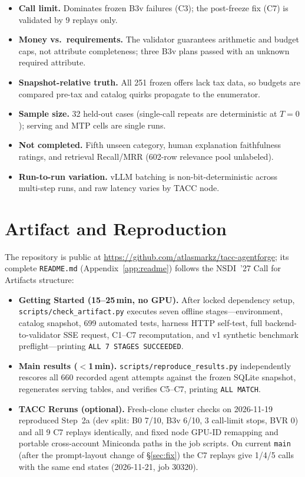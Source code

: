 \documentclass[10pt,letterpaper,twocolumn]{article}
\newcommand{\repo}{\url{https://github.com/atlasmarkz/tacc-agentforge}}
\begin{document}
\begin{itemize}
\item \textbf{Call limit.} Dominates frozen B3v failures (C3); the post-freeze fix (C7) is validated by 9 replays only.
\item \textbf{Money vs.\ requirements.} The validator guarantees arithmetic and budget caps, not attribute completeness; three B3v plans passed with an unknown required attribute.
\item \textbf{Snapshot-relative truth.} All 251 frozen offers lack tax data, so budgets are compared pre-tax and catalog quirks propagate to the enumerator.
\item \textbf{Sample size.} 32 held-out cases (single-call repeats are deterministic at $T{=}0$); serving and MTP cells are single runs.
\item \textbf{Not completed.} Fifth unseen category, human explanation faithfulness ratings, and retrieval Recall/MRR (602-row relevance pool unlabeled).
\item \textbf{Run-to-run variation.} vLLM batching is non-bit-deterministic across multi-step runs, and raw latency varies by TACC node.
\end{itemize}

\section{Artifact and Reproduction}\label{sec:artifact}

The repository is public at \repo; its complete \texttt{README.md} (Appendix~\ref{app:readme}) follows the NSDI~'27
Call for Artifacts structure:
\begin{itemize}
\item \textbf{Getting Started (15--25\,min, no GPU).} After locked dependency setup, \texttt{scripts/check\_artifact.py}
executes seven offline stages---environment, catalog snapshot, 699 automated tests, harness HTTP self-test, full
backend-to-validator SSE request, C1--C7 recomputation, and v1 synthetic benchmark preflight---printing
\texttt{ALL 7 STAGES SUCCEEDED}.
\item \textbf{Main results ($<$1\,min).} \texttt{scripts/reproduce\_results.py} independently rescores all 660
recorded agent attempts against the frozen SQLite snapshot, regenerates serving tables, and verifies C5--C7, printing
\texttt{ALL MATCH}.
\item \textbf{TACC Reruns (optional).} Fresh-clone cluster checks on 2026-11-19 reproduced Step~2a (dev split: B0 7/10,
B3v 6/10, 3 call-limit stops, BVR 0) and all 9 C7 replays identically, and fixed node GPU-ID remapping and portable
cross-account Miniconda paths in the job scripts. On current \texttt{main} (after the prompt-layout change of
\S\ref{sec:fix}) the C7 replays give 1/4/5 calls with the same end states (2026-11-21, job 30320).
\end{itemize}
\end{document}

